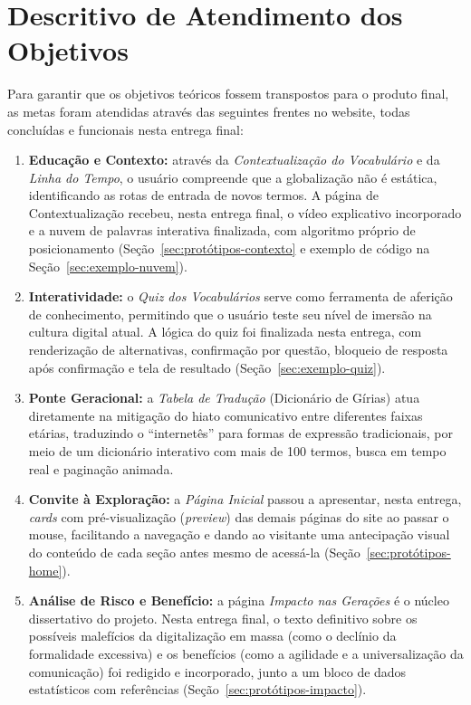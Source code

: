 \documentclass[12pt,a4paper]{article}
\begin{document}
\section{Descritivo de Atendimento dos Objetivos}
\label{sec:descritivo-objetivos}

Para garantir que os objetivos teóricos fossem transpostos para o produto final, as metas foram
atendidas através das seguintes frentes no website, todas concluídas e funcionais nesta entrega
final:

\begin{enumerate}[leftmargin=*, label=\roman*.]
    \item \textbf{Educação e Contexto:} através da \textit{Contextualização do Vocabulário} e da
    \textit{Linha do Tempo}, o usuário compreende que a globalização não é estática,
    identificando as rotas de entrada de novos termos. A página de Contextualização recebeu,
    nesta entrega final, o vídeo explicativo incorporado e a nuvem de palavras interativa
    finalizada, com algoritmo próprio de posicionamento (Seção~\ref{sec:protótipos-contexto} e
    exemplo de código na Seção~\ref{sec:exemplo-nuvem}).
    \item \textbf{Interatividade:} o \textit{Quiz dos Vocabulários} serve como
    ferramenta de aferição de conhecimento, permitindo que o usuário teste seu nível de imersão
    na cultura digital atual. A lógica do quiz foi finalizada nesta entrega, com renderização de
    alternativas, confirmação por questão, bloqueio de resposta após confirmação e tela de
    resultado (Seção~\ref{sec:exemplo-quiz}).
    \item \textbf{Ponte Geracional:} a \textit{Tabela de Tradução} (Dicionário de Gírias) atua
    diretamente na mitigação do hiato comunicativo entre diferentes faixas etárias, traduzindo o
    ``internetês'' para formas de expressão tradicionais, por meio de um dicionário interativo
    com mais de 100 termos, busca em tempo real e paginação animada.
    \item \textbf{Convite à Exploração:} a \textit{Página Inicial} passou a apresentar, nesta
    entrega, \textit{cards} com pré-visualização (\textit{preview}) das demais páginas do site ao
    passar o mouse, facilitando a navegação e dando ao visitante uma antecipação visual do
    conteúdo de cada seção antes mesmo de acessá-la (Seção~\ref{sec:protótipos-home}).
    \item \textbf{Análise de Risco e Benefício:} a página \textit{Impacto nas Gerações} é o
    núcleo dissertativo do projeto. Nesta entrega final, o texto definitivo sobre os possíveis
    malefícios da digitalização em massa (como o declínio da formalidade excessiva) e os
    benefícios (como a agilidade e a universalização da comunicação) foi redigido e incorporado,
    junto a um bloco de dados estatísticos com referências (Seção~\ref{sec:protótipos-impacto}).
\end{enumerate}
\end{document}
